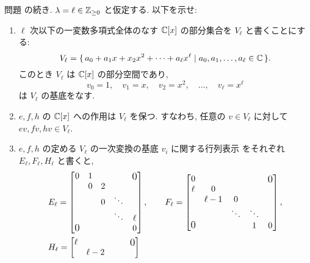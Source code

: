 \documentclass[12pt,twoside]{jarticle}
\begin{document}
\begin{question}
  \label{q:sl2-2}
  問題  の続き.
  $\lambda=\ell\in{\mathbb Z}_{\ge0}$ と仮定する. 以下を示せ:
  \begin{enumerate}
  \item $\ell$ 次以下の一変数多項式全体のなす ${\mathbb C}[x]$ の部分集合を $V_\ell$ 
    と書くことにする:
    \begin{equation*}
      V_\ell 
      = \{\, a_0 + a_1x + x_2x^2 + \cdots + a_\ell x^\ell
      \mid a_0,a_1,\ldots,a_\ell\in{\mathbb C} \,\}.
    \end{equation*}
    このとき $V_\ell$ は ${\mathbb C}[x]$ の部分空間であり, 
    \begin{equation*}
      v_0 = 1, \quad
      v_1 = x, \quad
      v_2 = x^2, \quad
      \ldots, \quad
      v_\ell = x^\ell
    \end{equation*}
    は $V_\ell$ の基底をなす.
  \item $e,f,h$ の ${\mathbb C}[x]$ への作用は $V_\ell$ を保つ.
    すなわち, 任意の $v\in V_\ell$ に対して $ev,fv,hv\in V_\ell$.
  \item $e,f,h$ の定める $V_\ell$ の一次変換の基底 $v_i$ に関する行列表示
    をそれぞれ $E_\ell,F_\ell,H_\ell$ と書くと,
    \begin{align*}
      &
      E_\ell =
      \begin{bmatrix}
        0 & 1 &   & & \bigzerou \\
          & 0 & 2 & & \\
          &   & 0 & \ddots & \\
          &   &   & \ddots & \ell \\
        \bigzerol & & &    & 0 \\
      \end{bmatrix},
      \qquad
      F_\ell =
      \begin{bmatrix}
        0    & & & & \bigzerou \\
        \ell &    0   & & & \\
             & \ell-1 & 0      & & \\
             &        & \ddots & \ddots & \\
        \bigzerol & &          &    1   & 0 \\
      \end{bmatrix},
      \\ &
      H_\ell =
      \begin{bmatrix}
        \ell & & & & \bigzerou \\
             & \ell-2 & & & \\

\end{bmatrix}
\end{align*}
\end{enumerate}
\end{question}
\end{document}
